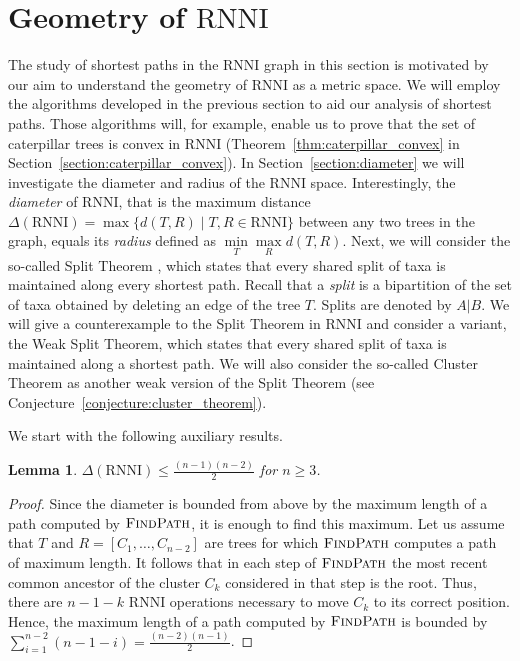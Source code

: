\documentclass{amsart}
\newcommand{\rnni}{\mathrm{RNNI}}
\newcommand{\findpath}{\textsc{FindPath}}
\newtheorem{lemma}[theorem]{Lemma}
\begin{document}
\section{Geometry of $\rnni$}
\label{section:geometry}

The study of shortest paths in the $\rnni$ graph in this section is motivated by our aim to understand the geometry of $\rnni$ as a metric space.
We will employ the algorithms developed in the previous section to aid our analysis of shortest paths.
Those algorithms will, for example, enable us to prove that the set of caterpillar trees is convex in $\rnni$ (Theorem~\ref{thm:caterpillar_convex} in Section~\ref{section:caterpillar_convex}).
In Section~\ref{section:diameter} we will investigate the diameter and radius of the $\rnni$ space.
Interestingly, the \emph{diameter} of $\rnni$, that is the maximum distance $\Delta(\rnni) = \max \{d(T, R) \mid T, R \in \rnni\}$ between any two trees in the graph, equals its \emph{radius} defined as $\min\limits_T \max\limits_R d(T,R)$.
Next, we will consider the so-called Split Theorem \autocite{Gavryushkin2018-ol}, which states that every shared split of taxa is maintained along every shortest path.
Recall that a \emph{split} is a bipartition of the set of taxa obtained by deleting an edge of the tree $T$.
Splits are denoted by $A|B$.
We will give a counterexample to the Split Theorem in $\rnni$ and consider a variant, the Weak Split Theorem, which states that every shared split of taxa is maintained along a shortest path.
We will also consider the so-called Cluster Theorem as another weak version of the Split Theorem (see Conjecture~\ref{conjecture:cluster_theorem}).

We start with the following auxiliary results.

\begin{lemma}
$\Delta(\rnni) \leq \frac{(n-1)(n-2)}{2}$ for $n \geq 3$.
\label{lemma:diameter_bound}
\end{lemma}

\begin{proof}
Since the diameter is bounded from above by the maximum length of a path computed by $\findpath$, it is enough to find this maximum.
Let us assume that $T$ and $R = [C_1, \ldots, C_{n-2}]$ are trees for which $\findpath$ computes a path of maximum length.
It follows that in each step of $\findpath$ the most recent common ancestor of the cluster $C_k$ considered in that step is the root.
Thus, there are $n-1-k$ $\rnni$ operations necessary to move $C_k$ to its correct position.
Hence, the maximum length of a path computed by $\findpath$ is bounded by $\sum\limits_{i = 1}^{n-2} (n-1-i) = \frac{(n-2)(n-1)}{2}$.
\end{proof}
\end{document}
